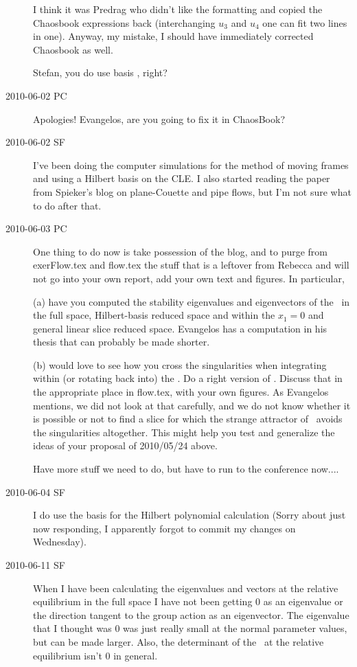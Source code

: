 \begin{description}
I think it was Predrag who didn't like the formatting and copied
the Chaosbook expressions back (interchanging $u_3$ and $u_4$ one
can fit two lines in one). Anyway, my mistake, I should have immediately
corrected Chaosbook as well.

Stefan, you do use basis , right?

\item[2010-06-02 PC] Apologies! Evangelos, are you going to fix it in ChaosBook?

\item[2010-06-02 SF]
I've been doing the computer simulations for the method of moving frames
and using a Hilbert basis on the CLE. I also started reading the paper from
Spieker's blog on plane-Couette and pipe flows, but I'm not sure what to do
after that.

\item[2010-06-03 PC]
One thing to do now is take possession of the blog,
and to purge from exerFlow.tex and flow.tex the stuff
that is a leftover from Rebecca and will not go into your own report,
add your own text and figures. In particular,

(a) have you computed the
stability eigenvalues and eigenvectors of the \reqv\ in
the full space, Hilbert-basis reduced space and within the $x_1=0$ and
general linear slice reduced space. Evangelos has a computation in his thesis
that can probably be made shorter.

(b) would love to see how you cross the singularities when integrating
within (or rotating back into) the \reducedsp. Do a right version
of . Discuss that in the appropriate
place in flow.tex, with your own figures. As Evangelos mentions, we
did not look at that carefully, and we do not know whether it is
possible or not to find a slice for which the strange attractor
of \cLe\ avoids the singularities altogether.
This might help you test and generalize the ideas
of your proposal of 2010/05/24 above.

Have more stuff we need to do, but have to run to the conference now....

\item[2010-06-04 SF]
I do use the basis  for the Hilbert polynomial calculation (Sorry about just now responding, I apparently forgot to commit my changes on Wednesday).

\item[2010-06-11 SF]
When I have been calculating the eigenvalues and vectors at the relative equilibrium in the full space I have not been getting 0 as an eigenvalue or the direction tangent to the group action as an eigenvector. The eigenvalue that I thought was 0 was just really small at the normal parameter values, but can be made larger. Also, the determinant of the \stabmat\ at the relative equilibrium isn't 0 in general.


\end{description}
